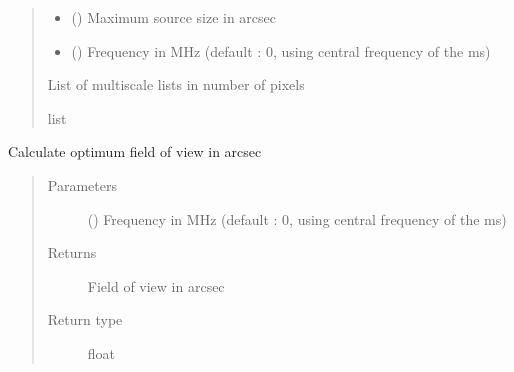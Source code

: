 \documentclass[letterpaper,10pt,english]{sphinxmanual}
\begin{document}
\begin{fulllineitems}
\begin{fulllineitems}
\begin{quote}
\begin{description}
\begin{itemize}
\item {} 
\sphinxAtStartPar
{} () \textendash{} Maximum source size in arcsec

\item {} 
\sphinxAtStartPar
{} () \textendash{} Frequency in MHz (default : 0, using central frequency of the ms)

\end{itemize}

\item[{Returns}] \leavevmode
\sphinxAtStartPar
List of multiscale lists in number of pixels

\item[{Return type}] \leavevmode
\sphinxAtStartPar
list

\end{description}\end{quote}

\end{fulllineitems}


\begin{fulllineitems}
\label{\detokenize{paircars:paircars.basic_func.ImageBasic.field_of_view}}
\sphinxAtStartPar
Calculate optimum field of view in arcsec
\begin{quote}\begin{description}
\item[{Parameters}] \leavevmode
\sphinxAtStartPar
{} () \textendash{} Frequency in MHz (default : 0, using central frequency of the ms)

\item[{Returns}] \leavevmode
\sphinxAtStartPar
Field of view in arcsec

\item[{Return type}] \leavevmode
\sphinxAtStartPar
float

\end{description}\end{quote}


\end{fulllineitems}
\end{fulllineitems}
\end{document}
